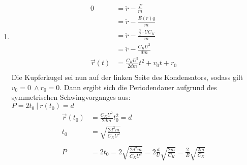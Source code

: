 \documentclass[11pt,letterpaper]{article}
\begin{document}
\begin{enumerate}
\begin{enumerate}
            \item
            \begin{align*}
                0 &= \ddot{r} - \frac{F}{m}\\
                &= \ddot{r} - \frac{E(r) q}{m}\\
                &= \ddot{r} - \frac{\frac{U}{d} \cdot U C_K}{m}\\
                &= \ddot{r} - \frac{C_K U^2}{d m}\\
                \vec{r}(t) &= \frac{C_K U^2}{2 d m}t^2 + v_0 t + r_0\\
            \end{align*}
            Die Kupferkugel sei nun auf der linken Seite des Kondensators, 
            sodass gilt $v_0=0\ \land r_0=0$. Dann ergibt sich die Periodendauer
            aufgrund des symmetrischen Schwingvorganges aus: \\$P = 2 t_0\ |\ r(t_0)=d $
            \begin{align*}
                \vec{r}(t_0) &= \frac{C_K U^2}{2 d m}t_0^2 = d\\
                t_0 &= \sqrt{\frac{2d^2 m}{C_K U^2}}\\
                \\
                P &= 2 t_0 = 2\sqrt{\frac{2d^2 m}{C_K U^2}} 
                = 2 \frac{d}{U}\sqrt{\frac{2m}{C_K}}
                = \frac{2}{E}\sqrt{\frac{2m}{C_K}}\\
            \end{align*}
        \end{enumerate}


\end{enumerate}
\end{document}
